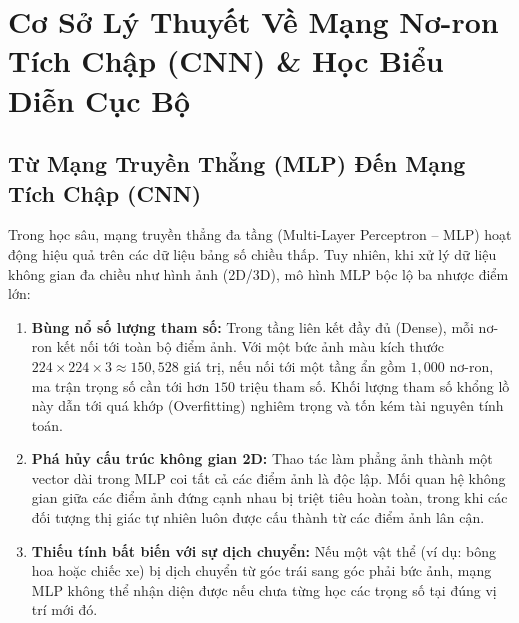 \documentclass[12pt,a4paper]{report}
\begin{document}
\tableofcontents
\newpage
\listoffigures
\newpage
\listoftables
\newpage
{}

\chapter{Cơ Sở Lý Thuyết Về Mạng Nơ-ron Tích Chập (CNN) \& Học Biểu Diễn Cục Bộ}

\section{Từ Mạng Truyền Thẳng (MLP) Đến Mạng Tích Chập (CNN)}
Trong học sâu, mạng truyền thẳng đa tầng (Multi-Layer Perceptron -- MLP) hoạt động hiệu quả trên các dữ liệu bảng số chiều thấp. Tuy nhiên, khi xử lý dữ liệu không gian đa chiều như hình ảnh (2D/3D), mô hình MLP bộc lộ ba nhược điểm lớn:

\begin{enumerate}
    \item \textbf{Bùng nổ số lượng tham số:} Trong tầng liên kết đầy đủ (Dense), mỗi nơ-ron kết nối tới toàn bộ điểm ảnh. Với một bức ảnh màu kích thước $224 \times 224 \times 3 \approx 150,528$ giá trị, nếu nối tới một tầng ẩn gồm $1,000$ nơ-ron, ma trận trọng số cần tới hơn $150$ triệu tham số. Khối lượng tham số khổng lồ này dẫn tới quá khớp (Overfitting) nghiêm trọng và tốn kém tài nguyên tính toán.
    
    \item \textbf{Phá hủy cấu trúc không gian 2D:} Thao tác làm phẳng ảnh thành một vector dài trong MLP coi tất cả các điểm ảnh là độc lập. Mối quan hệ không gian giữa các điểm ảnh đứng cạnh nhau bị triệt tiêu hoàn toàn, trong khi các đối tượng thị giác tự nhiên luôn được cấu thành từ các điểm ảnh lân cận.
    
    \item \textbf{Thiếu tính bất biến với sự dịch chuyển:} Nếu một vật thể (ví dụ: bông hoa hoặc chiếc xe) bị dịch chuyển từ góc trái sang góc phải bức ảnh, mạng MLP không thể nhận diện được nếu chưa từng học các trọng số tại đúng vị trí mới đó.
\end{enumerate}
\end{document}
